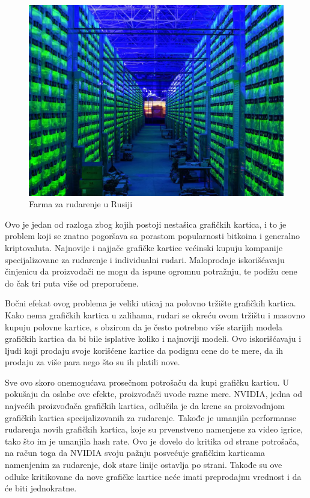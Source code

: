 \documentclass[a4paper]{article}
\begin{document}
\begin{figure}[h!]
	\begin{center}
		\includegraphics[scale=0.25]{farma.jpg}
	\end{center}
	\caption{Farma za rudarenje u Rusiji}
	\label{fig:farma}
\end{figure}

Ovo je jedan od razloga zbog kojih postoji nestašica grafičkih kartica, i to je problem koji se znatno pogoršava sa porastom popularnosti bitkoina i generalno kriptovaluta. Najnovije i najjače grafičke kartice većinski kupuju kompanije specijalizovane za rudarenje i individualni rudari. Maloprodaje iskorišćavaju činjenicu da proizvođači ne mogu da ispune ogromnu potražnju, te podižu cene do čak tri puta više od preporučene.

Bočni efekat ovog problema je veliki uticaj na polovno tržište grafičkih kartica. Kako nema grafičkih kartica u zalihama, rudari se okreću ovom tržištu i masovno kupuju polovne kartice, s obzirom da je često potrebno više starijih modela grafičkih kartica da bi bile isplative koliko i najnoviji modeli. Ovo iskorišćavaju i ljudi koji prodaju svoje korišćene kartice da podignu cene do te mere, da ih prodaju za više para nego što su ih platili nove.

Sve ovo skoro onemogućava prosečnom potrošaču da kupi grafičku karticu. U pokušaju da oslabe ove efekte, proizvođači uvode razne mere. NVIDIA, jedna od najvećih proizvođača grafičkih kartica, odlučila je da krene sa proizvodnjom grafičkih kartica specijalizovanih za rudarenje. Takođe je umanjila performanse rudarenja novih grafičkih kartica, koje su prvenstveno namenjene za video igrice, tako što im je umanjila hash rate. Ovo je dovelo do kritika od strane potrošača, na račun toga da NVIDIA svoju pažnju posvećuje grafičkim karticama namenjenim za rudarenje, dok stare linije ostavlja po strani. Takođe su ove odluke kritikovane da nove grafičke kartice neće imati preprodajnu vrednost i da će biti jednokratne.
\end{document}
